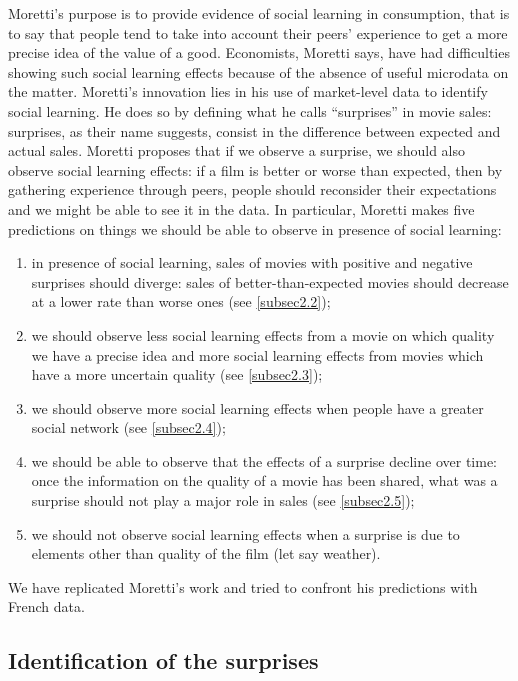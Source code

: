 Moretti's purpose is to provide evidence of social learning in consumption, that is to say that people tend to take into account their peers' experience to get a more precise idea of the value of a good. Economists, Moretti says, have had difficulties showing such social learning effects because of the absence of useful microdata on the matter. Moretti's innovation lies in his use of market-level data to identify social learning. He does so by defining what he calls ``surprises'' in movie sales: surprises, as their name suggests, consist in the difference between expected and actual sales. Moretti proposes that if we observe a surprise, we should also observe social learning effects: if a film is better or worse than expected, then by gathering experience through peers, people should reconsider their expectations and we might be able to see it in the data. In particular, Moretti makes five predictions on things we should be able to observe in presence of social learning: \begin{enumerate}
	\item in presence of social learning, sales of movies with positive and negative surprises should diverge: sales of better-than-expected movies should decrease at a lower rate than worse ones (see \ref{subsec2.2}); 
	\item we should observe less social learning effects from a movie on which quality we have a precise idea and more social learning effects from movies which have a more uncertain quality (see \ref{subsec2.3});
	\item we should observe more social learning effects when people have a greater social network (see \ref{subsec2.4});
	\item we should be able to observe that the effects of a surprise decline over time: once the information on the quality of a movie has been shared, what was a surprise should not play a major role in sales (see \ref{subsec2.5});
	\item we should not observe social learning effects when a surprise is due to elements other than quality of the film (let say weather).
\end{enumerate}
We have replicated Moretti's work and tried to confront his predictions with French data.
\pagebreak
\subsection{Identification of the surprises}\label{subsec2.1}

